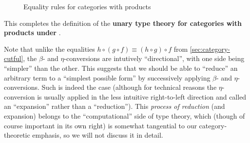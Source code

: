 \documentclass{book}
\let\types\vdash
\def\unit{\top}%
\def\ttt{\mathord{\ast}}%
\def\pair#1#2{\langle #1,#2\rangle}
\def\pr#1#2#3{\pi_{#1}^{#2,#3}}
\begin{document}
\begin{figure}
  \centering
  \caption{Equality rules for categories with products}
  \label{fig:catprod-equality}
\end{figure}

This completes the definition of the \textbf{unary type theory for categories with products under \cG}.

\begin{rmk}\label{rmk:beta-reduction}
  Note that unlike the equalities $h\circ (g\circ f) \equiv (h\circ g)\circ f$ from \cref{sec:category-cutful}, the $\beta$- and $\eta$-conversions are intutively ``directional'', with one side being ``simpler'' than the other.
  This suggests that we should be able to ``reduce'' an arbitrary term to a ``simplest possible form'' by successively applying $\beta$- and $\eta$-conversions.
  Such is indeed the case (although for technical reasons the $\eta$-conversion is usually applied in the less intuitive right-to-left direction and called an ``expansion'' rather than a ``reduction'').
  This \emph{process of reduction} (and expansion) belongs to the ``computational'' side of type theory, which (though of course important in its own right) is somewhat tangential to our category-theoretic emphasis, so we will not discuss it in detail.
\end{rmk}
\end{document}
